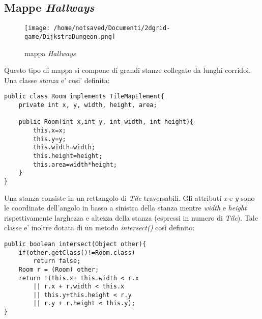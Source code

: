 \documentclass[11pt]{article}
\begin{document}
\subsection{Mappe \emph{Hallways}}
\begin{figure}[htp]
\centering
\texttt{[image: /home/notsaved/Documenti/2dgrid-game/DijkstraDungeon.png]}
\caption{mappa \emph{Hallways}}
\label{img1}
\end{figure}
Questo tipo di mappa si compone di grandi stanze collegate da lunghi corridoi. Una classe \emph{stanza} e' cosi' definita:

\begin{lstlisting}
public class Room implements TileMapElement{
	private int x, y, width, height, area;

	public Room(int x,int y, int width, int height){
		this.x=x;
		this.y=y;
		this.width=width;
		this.height=height;
		this.area=width*height;
	}
}

\end{lstlisting}
Una stanza consiste in un rettangolo di \emph{Tile} traversabili. Gli attributi \emph{x} e \emph{y} sono le coordinate dell'angolo in basso a sinistra della stanza mentre \emph{width} e \emph{height} rispettivamente larghezza e altezza della stanza (espressi in numero di \emph{Tile}). Tale classe e' inoltre dotata di un metodo \emph{intersect()} cos\`i definito:

\begin{lstlisting}
public boolean intersect(Object other){
    if(other.getClass()!=Room.class)
        return false;
    Room r = (Room) other;
    return !(this.x+ this.width < r.x 
        || r.x + r.width < this.x 
        || this.y+this.height < r.y 
        || r.y + r.height < this.y);
}

\end{lstlisting}
\end{document}
